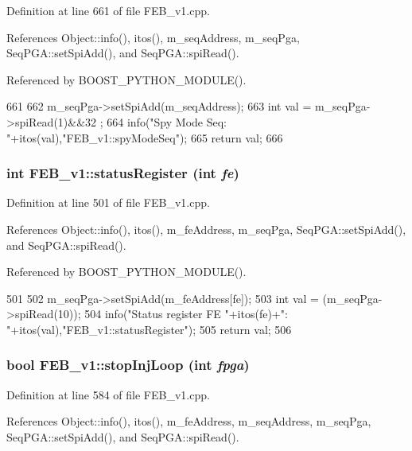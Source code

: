 Definition at line 661 of file FEB\_\-v1.cpp.

References Object::info(), itos(), m\_\-seqAddress, m\_\-seqPga, SeqPGA::setSpiAdd(), and SeqPGA::spiRead().

Referenced by BOOST\_\-PYTHON\_\-MODULE().


\begin{DoxyCode}
661                         {
662   m_seqPga->setSpiAdd(m_seqAddress);
663   int val = m_seqPga->spiRead(1)&&32 ;
664   info("Spy Mode Seq: "+itos(val),"FEB_v1::spyModeSeq");
665   return val;
666 }
\end{DoxyCode}
\hypertarget{classFEB__v1_aa98b8e0bcc4d6d03f4b365de786f5c95}{
\subsubsection[{statusRegister}]{\setlength{\rightskip}{0pt plus 5cm}int FEB\_\-v1::statusRegister (int {\em fe})}}
\label{classFEB__v1_aa98b8e0bcc4d6d03f4b365de786f5c95}


Definition at line 501 of file FEB\_\-v1.cpp.

References Object::info(), itos(), m\_\-feAddress, m\_\-seqPga, SeqPGA::setSpiAdd(), and SeqPGA::spiRead().

Referenced by BOOST\_\-PYTHON\_\-MODULE().


\begin{DoxyCode}
501                                 {  
502   m_seqPga->setSpiAdd(m_feAddress[fe]);
503   int val = (m_seqPga->spiRead(10));
504   info("Status register FE "+itos(fe)+": "+itos(val),"FEB_v1::statusRegister");
505   return val;
506 }
\end{DoxyCode}
\hypertarget{classFEB__v1_abfd23d8fbcea0415a7e8401110869a78}{
\subsubsection[{stopInjLoop}]{\setlength{\rightskip}{0pt plus 5cm}bool FEB\_\-v1::stopInjLoop (int {\em fpga})}}
\label{classFEB__v1_abfd23d8fbcea0415a7e8401110869a78}


Definition at line 584 of file FEB\_\-v1.cpp.

References Object::info(), itos(), m\_\-feAddress, m\_\-seqAddress, m\_\-seqPga, SeqPGA::setSpiAdd(), and SeqPGA::spiRead().

